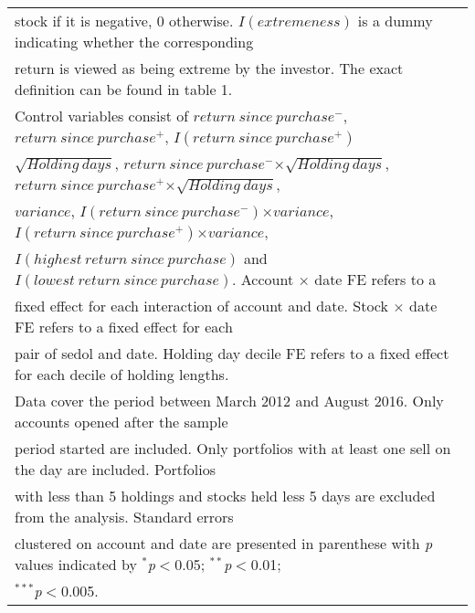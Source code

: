 \begin{table}[!htbp]
\begin{tabular}{@{\extracolsep{50pt}}lccc}
	\multicolumn{4}{l}{stock if it is negative, 0 otherwise. $I(extremeness)$ is a dummy indicating whether the corresponding }\\
	\multicolumn{4}{l}{return is viewed as being extreme by the investor. The exact definition can be found in table 1. }\\
	
	\multicolumn{4}{l}{Control variables consist of $return\:since\:purchase^-$,$return\:since\:purchase^+$, $I(return\:since\:purchase^+)$ }\\ 
	
	\multicolumn{4}{l}{$\sqrt{Holding\:days}$, $return\:since\:purchase^-$$\times$$\sqrt{Holding\:days}$, $return\:since\:purchase^+$$\times$$\sqrt{Holding\:days}$,}\\
	
	 \multicolumn{4}{l}{$variance$, $I(return\:since\:purchase^-)$$\times$$variance$, $I(return\:since\:purchase^+)$$\times$$variance$,}\\
	
     \multicolumn{4}{l}{$I(highest\:return\:since\:purchase)$ and $I(lowest\:return\:since\:purchase)$. Account $\times$ date FE refers to a }\\
	
	\multicolumn{4}{l}{fixed effect for each interaction of account and date. Stock $\times$ date FE refers to a fixed effect for each }\\
	\multicolumn{4}{l}{pair of sedol and date. Holding day decile FE refers to a fixed effect for each decile of holding lengths.}\\
	\multicolumn{4}{l}{ Data  cover the period between March 2012 and August 2016. Only accounts opened after the sample}\\
	\multicolumn{4}{l}{ period started are included. Only portfolios with at least one sell on the day are included. Portfolios }\\
	\multicolumn{4}{l}{with less than 5 holdings and stocks held less 5 days are excluded from the analysis. Standard errors }\\
	\multicolumn{4}{l}{clustered on account and date are presented in parenthese with \textit{p} values indicated by $^{*}$\textit{p}$<$0.05; $^{**}$\textit{p}$<$0.01;}\\ \multicolumn{2}{l}{$^{***}$\textit{p}$<$0.005.}\\ 
	\end{tabular} 
\end{table} 



